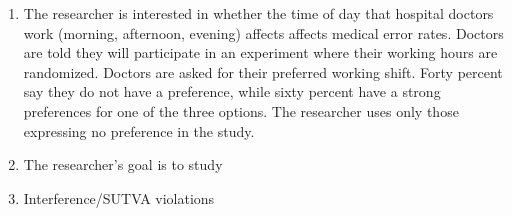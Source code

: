 \documentclass[12pt,a4]{article}
\begin{document}
\begin{enumerate}
\item The researcher is interested in whether the time of day that hospital doctors work (morning, afternoon, evening) affects affects medical error rates. Doctors are told they will participate in an experiment where their working hours are randomized. Doctors are asked for their preferred working shift. Forty percent say they do not have a preference, while sixty percent have a strong preferences for one of the three options. The researcher uses only those expressing no preference in the study. %

\item The researcher's goal is to study %

\item Interference/SUTVA violations

\end{enumerate}
\end{document}
